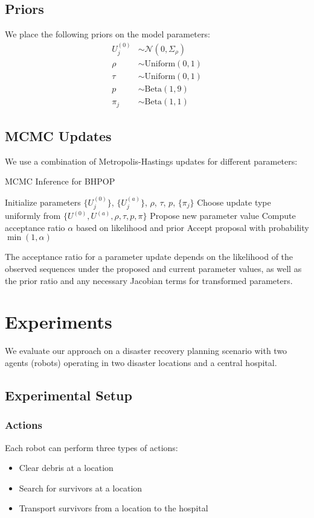 \documentclass[twocolumn, 10pt]{article}
\begin{document}
\subsection{Priors}
We place the following priors on the model parameters:
\begin{align}
U^{(0)}_j &\sim \mathcal{N}(0, \Sigma_\rho) \\
\rho &\sim \text{Uniform}(0, 1) \\
\tau &\sim \text{Uniform}(0, 1) \\
p &\sim \text{Beta}(1, 9) \\
\pi_j &\sim \text{Beta}(1, 1)
\end{align}

\subsection{MCMC Updates}
We use a combination of Metropolis-Hastings updates for different parameters:

\begin{algorithm}
\caption{MCMC Inference for BHPOP}
\begin{algorithmic}[1]
\State Initialize parameters $\{U^{(0)}_j\}$, $\{U^{(a)}_j\}$, $\rho$, $\tau$, $p$, $\{\pi_j\}$
    \State Choose update type uniformly from $\{U^{(0)}, U^{(a)}, \rho, \tau, p, \pi\}$
    \State Propose new parameter value
    \State Compute acceptance ratio $\alpha$ based on likelihood and prior
    \State Accept proposal with probability $\min(1, \alpha)$
\EndFor
\end{algorithmic}
\end{algorithm}

The acceptance ratio for a parameter update depends on the likelihood of the observed sequences under the proposed and current parameter values, as well as the prior ratio and any necessary Jacobian terms for transformed parameters.

\section{Experiments}
We evaluate our approach on a disaster recovery planning scenario with two agents (robots) operating in two disaster locations and a central hospital.

\subsection{Experimental Setup}
\subsubsection{Actions}
Each robot can perform three types of actions:
\begin{itemize}
    \item Clear debris at a location
    \item Search for survivors at a location
    \item Transport survivors from a location to the hospital
\end{itemize}
\end{document}
